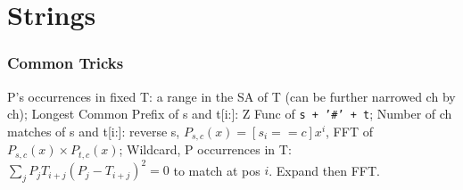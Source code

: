 \chapter{Strings}

\subsection{Common Tricks}
P's occurrences in fixed T: a range in the SA of T (can be further narrowed ch by ch);
Longest Common Prefix of s and t[i:]: Z Func of \texttt{s + '\#' + t};
Number of ch matches of s and t[i:]: reverse s, $P_{s,c}(x)=[s_i==c]x^i$, FFT of $P_{s,c}(x) \times P_{t,c}(x)$;
Wildcard, P occurrences in T: $\sum_j{P_jT_{i+j}(P_j-T_{i+j})^2}=0$ to match at pos $i$. Expand then FFT.

